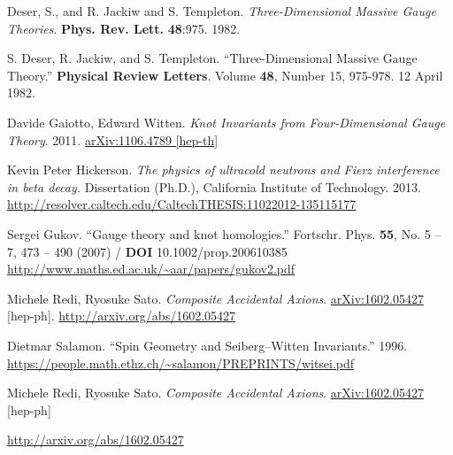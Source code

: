 \documentclass[10pt]{amsart}
\begin{document}
\begin{thebibliography}{9}
  Deser, S., and R. Jackiw and S. Templeton. \emph{Three-Dimensional Massive Gauge Theories}. \textbf{Phys. Rev. Lett.} \textbf{48}:975.  1982.

  S. Deser, R. Jackiw, and S. Templeton.  ``Three-Dimensional Massive Gauge Theory.'' \textbf{Physical Review Letters}. Volume \textbf{48}, Number 15, 975-978.  12 April 1982.  


  
Davide Gaiotto, Edward Witten. \emph{Knot Invariants from Four-Dimensional Gauge Theory}. 2011.   \href{http://arxiv.org/abs/1106.4789}{arXiv:1106.4789 [hep-th]}


Kevin Peter Hickerson.  \emph{The physics of ultracold neutrons and Fierz interference in beta decay.}  Dissertation (Ph.D.), California Institute of Technology. 2013.  \url{http://resolver.caltech.edu/CaltechTHESIS:11022012-135115177}


Sergei Gukov.  ``Gauge theory and knot homologies.''  Fortschr. Phys. \textbf{55}, No. 5 – 7, 473 – 490 (2007) / \textbf{DOI} 10.1002/prop.200610385  \url{http://www.maths.ed.ac.uk/~aar/papers/gukov2.pdf}

Michele Redi, Ryosuke Sato. \emph{Composite Accidental Axions}. \href{arXiv:1602.05427 [hep-ph]}{arXiv:1602.05427} [hep-ph].  \url{http://arxiv.org/abs/1602.05427}


Dietmar Salamon.  ``Spin Geometry and Seiberg–Witten Invariants.''  1996.  \url{https://people.math.ethz.ch/~salamon/PREPRINTS/witsei.pdf}






Michele Redi, Ryosuke Sato. \emph{Composite Accidental Axions}. \href{arXiv:1602.05427 [hep-ph]}{arXiv:1602.05427} [hep-ph]

\url{http://arxiv.org/abs/1602.05427}


\end{thebibliography}
\end{document}
